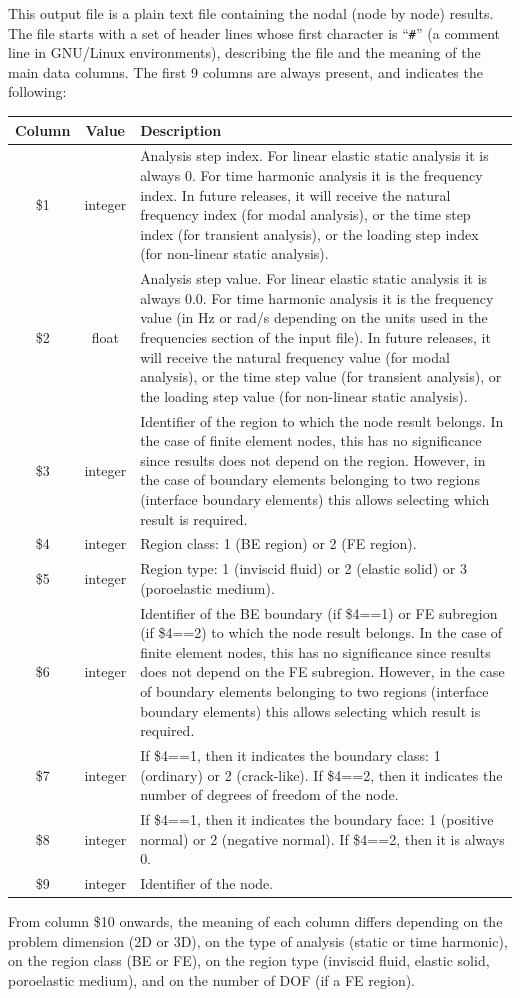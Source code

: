 \documentclass[a4paper,fleqn]{book}
\begin{document}

This output file is a plain text file containing the nodal (node by node) results. The file starts with a set of header lines whose first character is ``\texttt{\#}'' (a comment line in GNU/Linux environments), describing the file and the meaning of the main data columns. The first 9 columns are always present, and indicates the following:
\begin{longtable}{ccp{11cm}}
\textbf{Column} & \textbf{Value} &\textbf{Description} \\ 
\endhead
\midrule
\$1 & integer & Analysis step index. For linear elastic static analysis it is always 0. For time harmonic analysis it is the frequency index. In future releases, it will receive the natural frequency index (for modal analysis), or the time step index (for transient analysis), or the loading step index (for non-linear static analysis). \\
\$2 & float & Analysis step value. For linear elastic static analysis it is always 0.0. For time harmonic analysis it is the frequency value (in Hz or rad/s depending on the units used in the frequencies section of the input file). In future releases, it will receive the natural frequency value (for modal analysis), or the time step value (for transient analysis), or the loading step value (for non-linear static analysis). \\
\$3 & integer & Identifier of the region to which the node result belongs. In the case of finite element nodes, this has no significance since results does not depend on the region. However, in the case of boundary elements belonging to two regions (interface boundary elements) this allows selecting which result is required. \\
\$4 & integer & Region class: 1 (BE region) or 2 (FE region). \\
\$5 & integer & Region type: 1 (inviscid fluid) or 2 (elastic solid) or 3 (poroelastic medium). \\
\$6 & integer & Identifier of the BE boundary (if \$4==1) or FE subregion (if \$4==2) to which the node result belongs. In the case of finite element nodes, this has no significance since results does not depend on the FE subregion. However, in the case of boundary elements belonging to two regions (interface boundary elements) this allows selecting which result is required. \\
\$7 & integer & If \$4==1, then it indicates the boundary class: 1 (ordinary) or 2 (crack-like). If \$4==2, then it indicates the number of degrees of freedom of the node. \\
\$8 & integer & If \$4==1, then it indicates the boundary face: 1 (positive normal) or 2 (negative normal). If \$4==2, then it is always 0. \\
\$9 & integer & Identifier of the node. \\
\end{longtable}
From column \$10 onwards, the meaning of each column differs depending on the problem dimension (2D or 3D), on the type of analysis (static or time harmonic), on the region class (BE or FE), on the region type (inviscid fluid, elastic solid, poroelastic medium), and on the number of DOF (if a FE region).
\end{document}
